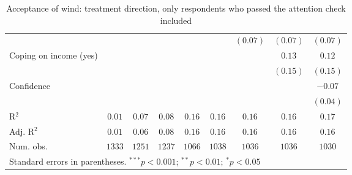 \begin{table}[h]
\begin{center}
\begin{tabular}{l c c c c c c c c}
                                                                                &             &               &               &               &               & $(0.07)$      & $(0.07)$      & $(0.07)$      \\
Coping on income (yes)                                                          &             &               &               &               &               &               & $0.13$        & $0.12$        \\
                                                                                &             &               &               &               &               &               & $(0.15)$      & $(0.15)$      \\
Confidence                                                                      &             &               &               &               &               &               &               & $-0.07$       \\
                                                                                &             &               &               &               &               &               &               & $(0.04)$      \\
\hline
R$^2$                                                                           & $0.01$      & $0.07$        & $0.08$        & $0.16$        & $0.16$        & $0.16$        & $0.16$        & $0.17$        \\
Adj. R$^2$                                                                      & $0.01$      & $0.06$        & $0.08$        & $0.16$        & $0.16$        & $0.16$        & $0.16$        & $0.16$        \\
Num. obs.                                                                       & $1333$      & $1251$        & $1237$        & $1066$        & $1038$        & $1036$        & $1036$        & $1030$        \\
\hline
\multicolumn{9}{l}{\scriptsize{Standard errors in parentheses. $^{***}p<0.001$; $^{**}p<0.01$; $^{*}p<0.05$}}
\end{tabular}
\caption{Acceptance of wind: treatment direction, only respondents who passed the attention check included}
\label{table:acceptance_wind_speeders_excluded}
\end{center}
\end{table}
